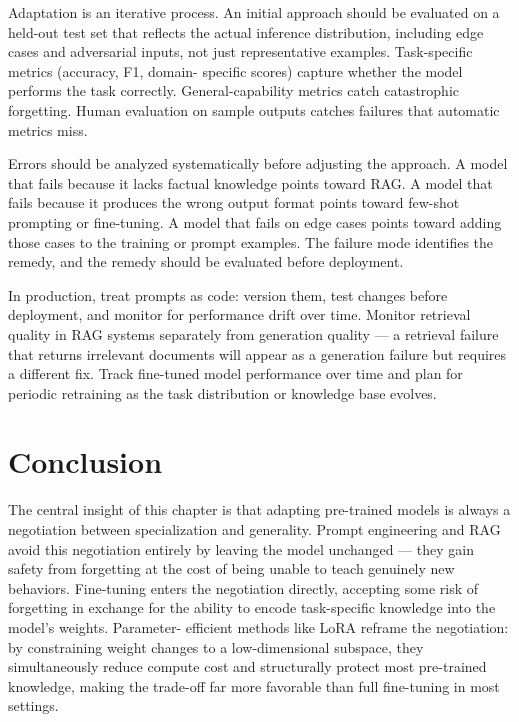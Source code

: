 \documentclass{book}
\begin{document}
Adaptation is an iterative process. An initial approach should be
evaluated on a held-out test set that reflects the actual inference
distribution, including edge cases and adversarial inputs, not just
representative examples. Task-specific metrics (accuracy, F1, domain-
specific scores) capture whether the model performs the task correctly.
General-capability metrics catch catastrophic forgetting. Human
evaluation on sample outputs catches failures that automatic metrics
miss.

Errors should be analyzed systematically before adjusting the approach.
A model that fails because it lacks factual knowledge points toward
RAG. A model that fails because it produces the wrong output format
points toward few-shot prompting or fine-tuning. A model that fails on
edge cases points toward adding those cases to the training or prompt
examples. The failure mode identifies the remedy, and the remedy should
be evaluated before deployment.

In production, treat prompts as code: version them, test changes
before deployment, and monitor for performance drift over time. Monitor
retrieval quality in RAG systems separately from generation quality ---
a retrieval failure that returns irrelevant documents will appear as a
generation failure but requires a different fix. Track fine-tuned model
performance over time and plan for periodic retraining as the task
distribution or knowledge base evolves.

\section{Conclusion}
\label{sec:adapt_conclusion}

The central insight of this chapter is that adapting pre-trained models
is always a negotiation between specialization and generality. Prompt
engineering and RAG avoid this negotiation entirely by leaving the model
unchanged --- they gain safety from forgetting at the cost of being unable
to teach genuinely new behaviors. Fine-tuning enters the negotiation
directly, accepting some risk of forgetting in exchange for the ability
to encode task-specific knowledge into the model's weights. Parameter-
efficient methods like LoRA reframe the negotiation: by constraining
weight changes to a low-dimensional subspace, they simultaneously reduce
compute cost and structurally protect most pre-trained knowledge, making
the trade-off far more favorable than full fine-tuning in most settings.
\end{document}
